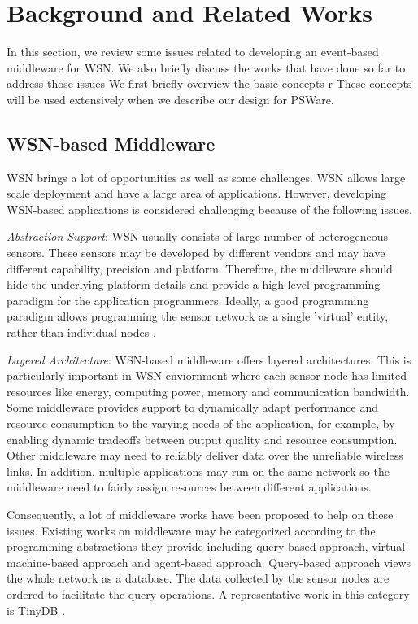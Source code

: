 \section{Background and Related Works}
\label{sec:background}
In this section, we review some issues related to developing an event-based middleware for WSN. We also briefly discuss the works that have done so far to address those issues
We first briefly overview the basic concepts r These concepts will be used extensively when we describe our design for PSWare.

\subsection{WSN-based Middleware}
WSN brings a lot of opportunities as well as some challenges. WSN allows large scale deployment and have a large area of applications. However, developing WSN-based applications is considered challenging because of the following issues.

\emph{Abstraction Support}: WSN usually consists of large number of heterogeneous sensors. These sensors may be developed by different vendors and may have different capability, precision and platform. Therefore, the middleware should hide the underlying platform details and provide a high level programming paradigm for the application programmers. Ideally, a good programming paradigm allows programming the sensor network as a single 'virtual' entity, rather than individual nodes \cite{programmingparadigms}.

\emph{Layered Architecture}: WSN-based middleware offers layered architectures. This is particularly important in WSN enviornment where each sensor node has limited resources like energy, computing power, memory and communication bandwidth. Some middleware provides support to dynamically adapt performance and resource consumption to the varying needs of the application, for example, by enabling dynamic tradeoffs between output quality and resource consumption. Other middleware may need to reliably deliver data over the unreliable wireless links. In addition, multiple applications may run on the same network so the middleware need to fairly assign resources between different applications.

Consequently, a lot of middleware works have been proposed to help on these issues. Existing works on middleware may be categorized according to the programming abstractions they provide including query-based approach, virtual machine-based approach and agent-based approach. Query-based approach views the whole network as a database. The data collected by the sensor nodes are ordered to facilitate the query operations. A representative work in this category is TinyDB \cite{tinydb}.

